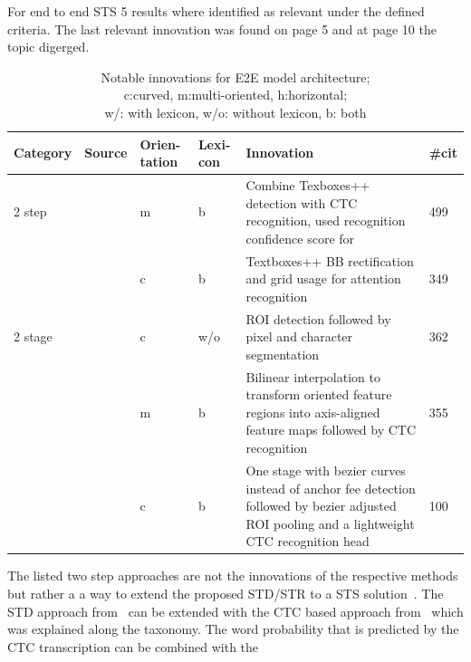 For end to end \ac{STS} 5 results where identified as relevant under the defined criteria.
The last relevant innovation was found on page 5 and at page 10 the topic digerged.
\begin{table}[h]
    \centering\scriptsize
    \begin{tabular}{p{}p{}p{}p{}
            p{}p{}}
        Category & Source & Orien-tation & Lexi-con & Innovation & \#cit\\
        \toprule
        2 step &~\cite{liao_textboxes_2018} & m & b & Combine Texboxes++ detection with \ac{CTC}
            recognition, used recognition confidence score for & 499\\
            &~\cite{shi_aster_2019} & c & b & Textboxes++ \ac{BB} rectification and grid usage for
                attention recognition & 349 \\
        2 stage &~\cite{lyu_mask_2018} & c & w/o & \ac{ROI} detection followed by pixel and character
            segmentation & 362 \\
            &~\cite{liu_fots_2018} & m & b & Bilinear interpolation to transform oriented feature
                regions into axis-aligned feature maps followed by \ac{CTC} recognition & 355 \\
            &~\cite{liu_abcnet_2020} & c & b & One stage with bezier curves instead of anchor fee
                detection followed by bezier adjusted ROI pooling and a lightweight \ac{CTC}
                recognition head & 100 \\
        \bottomrule
    \end{tabular}
    \captionsetup{justification=centering}
    \caption[Notable innovations for E2E model architecture]{%
        Notable innovations for E2E model architecture; \\
        c:curved, m:multi-oriented, h:horizontal; \\
        w/: with lexicon, w/o: without lexicon, b: both\label{tb:E2E-steps-properties}
    }
\end{table}
The listed two step approaches are not the innovations of the respective methods but rather a
a way to extend the proposed \ac{STD}/\ac{STR} to a \ac{STS}
solution~\citep{liao_textboxes_2018,shi_aster_2019}.
The \ac{STD} approach from~\cite{liao_textboxes_2018} can be extended with the \ac{CTC} based
approach from~\cite{shi_end--end_2017} which was explained along the taxonomy.
The word probability that is predicted by the \ac{CTC} transcription can be combined with the
